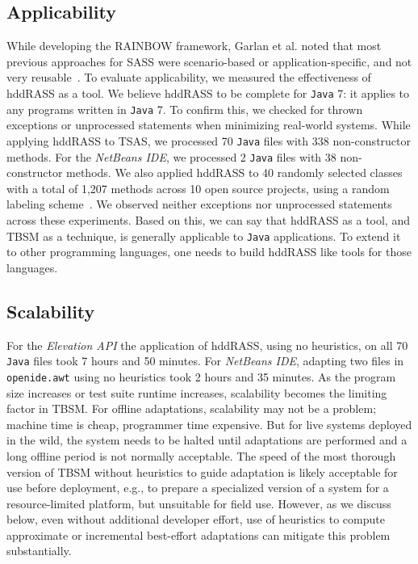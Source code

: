 \subsection{Applicability}
While developing the RAINBOW framework, Garlan et al. noted that most previous approaches for SASS were scenario-based or application-specific, and not very reusable~\cite{garlan2004rainbow}. To evaluate applicability, we measured the effectiveness of hddRASS as a tool. We believe hddRASS to be complete for \texttt{Java} 7: it applies to any programs written in \texttt{Java} 7. To confirm this, we checked for thrown exceptions or unprocessed statements when minimizing real-world systems. While applying hddRASS to TSAS, we processed 70 \texttt{Java} files with 338 non-constructor methods. For the \textit{NetBeans IDE}, we processed 2 \texttt{Java} files with 38 non-constructor methods. We also applied hddRASS to 40 randomly selected classes with a total of 1,207 methods across 10 open source projects, using a random labeling scheme~\cite{christi2018qrs}. We observed neither exceptions nor unprocessed statements across these experiments. Based on this, we can say that hddRASS as a tool, and TBSM as a technique, is generally applicable to \texttt{Java} applications. To extend it to other programming languages, one needs to build hddRASS like tools for those languages.    

\subsection{Scalability}
For the \textit{Elevation API} the application of hddRASS, using no heuristics, on all 70 {\tt Java} files took 7 hours and 50 minutes. For \textit{NetBeans IDE}, adapting two files in \texttt{openide.awt} using no heuristics took 2 hours and 35 minutes. As the program size increases or test suite runtime increases, scalability becomes the limiting factor in TBSM. For offline adaptations, scalability may not be a problem; machine time is cheap, programmer time expensive. But for live systems deployed in the wild, the system needs to be halted until adaptations are performed and a long offline period is not normally acceptable.  The speed of the most thorough version of TBSM without heuristics to guide adaptation is likely acceptable for use before deployment, e.g., to prepare a specialized version of a system for a resource-limited platform, but unsuitable for field use.  However, as we discuss below, even without additional developer effort, use of heuristics to compute approximate or incremental best-effort adaptations can mitigate this problem substantially.

